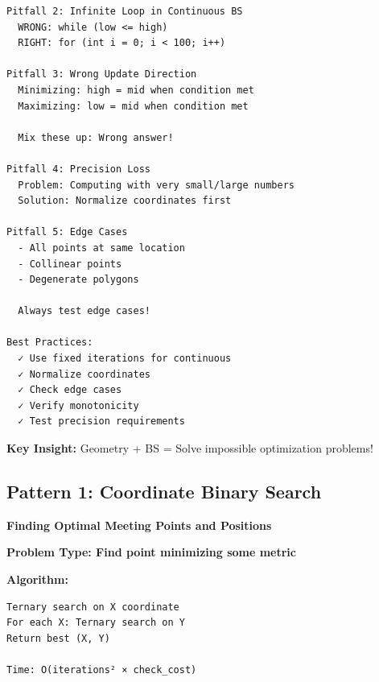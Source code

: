 \documentclass[11pt,a4paper,oneside]{book}
\begin{document}
\begin{tcolorbox}[
    enhanced,breakable,
    colback=white,
    colframe=deepblue,
    boxrule=1.5pt,
    arc=3mm,
    title=\textbf{Spatial Monotonicity and Continuous Optimization}
]
\begin{verbatim}
Pitfall 2: Infinite Loop in Continuous BS
  WRONG: while (low <= high)
  RIGHT: for (int i = 0; i < 100; i++)

Pitfall 3: Wrong Update Direction
  Minimizing: high = mid when condition met
  Maximizing: low = mid when condition met
  
  Mix these up: Wrong answer!

Pitfall 4: Precision Loss
  Problem: Computing with very small/large numbers
  Solution: Normalize coordinates first

Pitfall 5: Edge Cases
  - All points at same location
  - Collinear points
  - Degenerate polygons
  
  Always test edge cases!

Best Practices:
  ✓ Use fixed iterations for continuous
  ✓ Normalize coordinates
  ✓ Check edge cases
  ✓ Verify monotonicity
  ✓ Test precision requirements
\end{verbatim}

\textbf{Key Insight:}
Geometry + BS = Solve impossible optimization problems!
\end{tcolorbox}

\subsection{Pattern 1: Coordinate Binary Search}

\begin{tcolorbox}[
    enhanced,breakable,
    colback=successgreen!10,
    colframe=successgreen,
    boxrule=1.5pt,
    arc=3mm,
    title=\textbf{Complete Coordinate Optimization Algorithms}
]
\textbf{Finding Optimal Meeting Points and Positions}

\textbf{Problem Type: Find point minimizing some metric}

\textbf{Algorithm:}
\begin{verbatim}
Ternary search on X coordinate
For each X: Ternary search on Y
Return best (X, Y)

Time: O(iterations² × check_cost)
\end{verbatim}
\end{tcolorbox}
\end{document}
